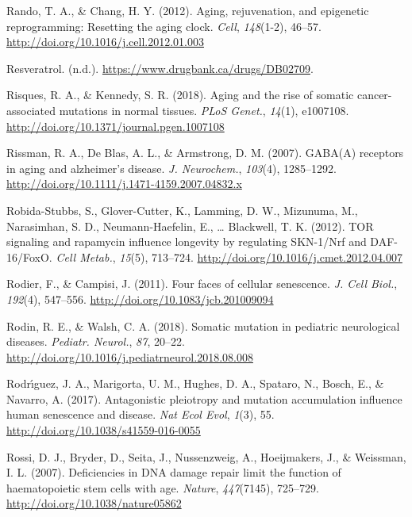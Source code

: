 \documentclass[12pt,twoside]{unicam}
\begin{document}
\begin{cslreferences}
\leavevmode\hypertarget{ref-Rando2012}{}%
Rando, T. A., \& Chang, H. Y. (2012). Aging, rejuvenation, and epigenetic reprogramming: Resetting the aging clock. \emph{Cell}, \emph{148}(1-2), 46--57. \url{http://doi.org/10.1016/j.cell.2012.01.003}

\leavevmode\hypertarget{ref-Resveratrol}{}%
Resveratrol. (n.d.). \url{https://www.drugbank.ca/drugs/DB02709}.

\leavevmode\hypertarget{ref-Risques2018}{}%
Risques, R. A., \& Kennedy, S. R. (2018). Aging and the rise of somatic cancer-associated mutations in normal tissues. \emph{PLoS Genet.}, \emph{14}(1), e1007108. \url{http://doi.org/10.1371/journal.pgen.1007108}

\leavevmode\hypertarget{ref-Rissman2007}{}%
Rissman, R. A., De Blas, A. L., \& Armstrong, D. M. (2007). GABA(A) receptors in aging and alzheimer's disease. \emph{J. Neurochem.}, \emph{103}(4), 1285--1292. \url{http://doi.org/10.1111/j.1471-4159.2007.04832.x}

\leavevmode\hypertarget{ref-Robida-Stubbs2012}{}%
Robida-Stubbs, S., Glover-Cutter, K., Lamming, D. W., Mizunuma, M., Narasimhan, S. D., Neumann-Haefelin, E., \ldots{} Blackwell, T. K. (2012). TOR signaling and rapamycin influence longevity by regulating SKN-1/Nrf and DAF-16/FoxO. \emph{Cell Metab.}, \emph{15}(5), 713--724. \url{http://doi.org/10.1016/j.cmet.2012.04.007}

\leavevmode\hypertarget{ref-Rodier2011}{}%
Rodier, F., \& Campisi, J. (2011). Four faces of cellular senescence. \emph{J. Cell Biol.}, \emph{192}(4), 547--556. \url{http://doi.org/10.1083/jcb.201009094}

\leavevmode\hypertarget{ref-Rodin2018}{}%
Rodin, R. E., \& Walsh, C. A. (2018). Somatic mutation in pediatric neurological diseases. \emph{Pediatr. Neurol.}, \emph{87}, 20--22. \url{http://doi.org/10.1016/j.pediatrneurol.2018.08.008}

\leavevmode\hypertarget{ref-Rodriguez2017}{}%
Rodrı́guez, J. A., Marigorta, U. M., Hughes, D. A., Spataro, N., Bosch, E., \& Navarro, A. (2017). Antagonistic pleiotropy and mutation accumulation influence human senescence and disease. \emph{Nat Ecol Evol}, \emph{1}(3), 55. \url{http://doi.org/10.1038/s41559-016-0055}

\leavevmode\hypertarget{ref-Rossi2007}{}%
Rossi, D. J., Bryder, D., Seita, J., Nussenzweig, A., Hoeijmakers, J., \& Weissman, I. L. (2007). Deficiencies in DNA damage repair limit the function of haematopoietic stem cells with age. \emph{Nature}, \emph{447}(7145), 725--729. \url{http://doi.org/10.1038/nature05862}


\end{cslreferences}
\end{document}
